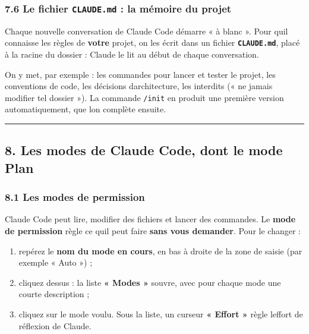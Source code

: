 \documentclass[
  french,
  11pt,
  a4paper,
]{article}
\providecommand{\tightlist}{%
  \setlength{\itemsep}{0pt}\setlength{\parskip}{0pt}}
\begin{document}
\subsubsection{\texorpdfstring{7.6 Le fichier \texttt{CLAUDE.md} : la
mémoire du
projet}{7.6 Le fichier CLAUDE.md : la mémoire du projet}}\label{76-le-fichier-claudemd--la-muxe9moire-du-projet}

Chaque nouvelle conversation de Claude Code démarre « à blanc ». Pour
qu\textquotesingle il connaisse les règles de \textbf{votre} projet, on
les écrit dans un fichier \textbf{\texttt{CLAUDE.md}}, placé à la racine
du dossier : Claude le lit au début de chaque conversation.

On y met, par exemple : les commandes pour lancer et tester le projet,
les conventions de code, les décisions d\textquotesingle architecture,
les interdits (« ne jamais modifier tel dossier »). La commande
\texttt{/init} en produit une première version automatiquement, que
l\textquotesingle on complète ensuite.

\begin{center}\rule{0.5\linewidth}{0.5pt}\end{center}

\subsection{8. Les modes de Claude Code, dont le mode
Plan}\label{8-les-modes-de-claude-code-dont-le-mode-plan}

\subsubsection{8.1 Les modes de
permission}\label{81-les-modes-de-permission}

Claude Code peut lire, modifier des fichiers et lancer des commandes. Le
\textbf{mode de permission} règle ce qu\textquotesingle il peut faire
\textbf{sans vous demander}. Pour le changer :

\begin{enumerate}
\def\labelenumi{\arabic{enumi}.}
\tightlist
\item
  repérez le \textbf{nom du mode en cours}, en bas à droite de la zone
  de saisie (par exemple « Auto ») ;
\item
  cliquez dessus : la liste \textbf{« Modes »} s\textquotesingle ouvre,
  avec pour chaque mode une courte description ;
\item
  cliquez sur le mode voulu. Sous la liste, un curseur \textbf{« Effort
  »} règle l\textquotesingle effort de réflexion de Claude.
\end{enumerate}
\end{document}
